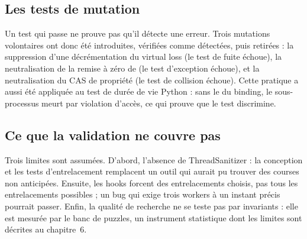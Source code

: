 \subsection{Les tests de mutation}

Un test qui passe ne prouve pas qu'il d\'etecte une erreur. Trois mutations
volontaires ont donc \'et\'e introduites, v\'erifi\'ees comme d\'etect\'ees,
puis retir\'ees : la suppression d'une d\'ecr\'ementation du virtual loss
(le test de fuite \'echoue), la neutralisation de la remise \`a z\'ero de
 (le test d'exception \'echoue), et la neutralisation du CAS de
propri\'et\'e (le test de collision \'echoue). Cette pratique a aussi
\'et\'e appliqu\'ee au test de dur\'ee de vie Python : sans le
 du binding, le sous-processus meurt par violation
d'acc\`es, ce qui prouve que le test discrimine.

\subsection{Ce que la validation ne couvre pas}

Trois limites sont assum\'ees. D'abord, l'absence de ThreadSanitizer : la
conception et les tests d'entrelacement remplacent un outil qui aurait pu
trouver des courses non anticip\'ees. Ensuite, les hooks forcent des
entrelacements choisis, pas tous les entrelacements possibles ; un bug qui
exige trois workers \`a un instant pr\'ecis pourrait passer. Enfin, la
qualit\'e de recherche ne se teste pas par invariants : elle est mesur\'ee
par le banc de puzzles, un instrument statistique dont les limites sont
d\'ecrites au chapitre~6.
